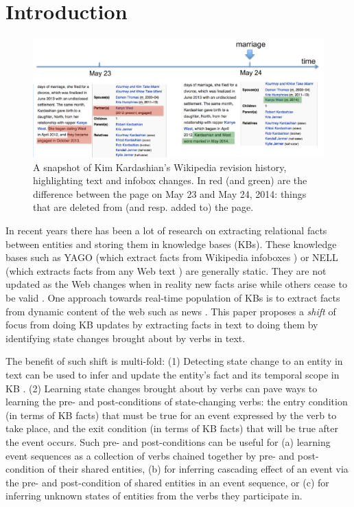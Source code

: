 \section{Introduction}

\begin{figure}[t]
\begin{center}
\includegraphics[width=14cm,keepaspectratio=true]{figures/motivation.pdf}
\caption{\label{fig:motivation} A snapshot of Kim Kardashian's Wikipedia revision history, highlighting text and infobox changes. In red (and green) are the difference between the page on May 23 and May 24, 2014: things that are deleted from (and resp. added to) the page.}
\end{center}
\end{figure}

In recent years there has been a lot of research on extracting relational facts between entities and storing them in knowledge bases (KBs). These knowledge bases such as YAGO (which extract facts from Wikipedia infoboxes \cite{suchanek2007yago}) or NELL (which extracts facts from any Web text \cite{carlson2010toward,fader2011identifying}) are generally static. They are not updated as the Web changes when in reality new facts arise while others cease to be valid%
. One approach towards real-time population of KBs is to extract facts from dynamic content of the web such as news \cite{nakashole2012real}. This paper proposes a \textit{shift} of focus from doing KB updates by extracting facts in text to doing them by identifying state changes brought about by verbs in text. 

The benefit of such shift is multi-fold: (1) Detecting state change to an entity in text can be used to infer and update the entity's fact and its temporal scope in KB \cite{wijayactp}. (2) Learning state changes brought about by verbs can pave ways to learning the pre- and post-conditions of state-changing verbs: the entry condition (in terms of KB facts) that must be true for an event expressed by the verb to take place, and the exit condition (in terms of KB facts) that will be true after the event occurs. Such pre- and post-conditions can be useful for (a) learning event sequences %
as a collection of verbs chained together by pre- and post-condition of their shared entities, (b) for inferring cascading effect of an event via the pre- and post-condition of shared entities in an event sequence, or (c) for inferring unknown states of entities from the verbs they participate in.  

